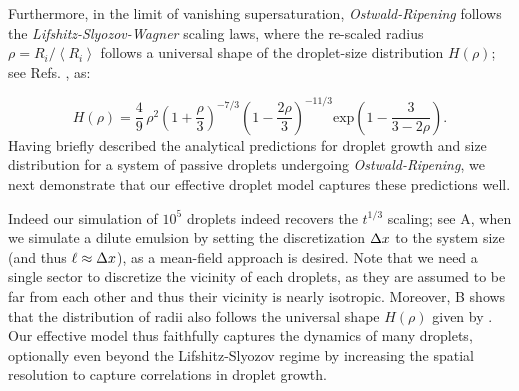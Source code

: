 Furthermore, in the limit of vanishing supersaturation, \textit{Ostwald-Ripening} follows the \textit{Lifshitz-Slyozov-Wagner} scaling laws, where the re-scaled radius $\rho = R_i/{\left \langle R_i \right \rangle}$ follows a universal shape of the droplet-size distribution $H(\rho)$; see Refs. \cite{Review2019,LSWanalytics}, as:

\begin{equation}
\label{eqn:LSW_histogram}
    H(\rho) = \frac{4}{9} \, \rho^2\left ( 1+ \frac{\rho}{3} \right ) ^ {-7/3} \left ( 1-\frac{2 \rho}{3} \right )^{-11/3} \mathrm{exp} \left ( 1 - \frac{3}{3 - 2\rho} \right ).
\end{equation}
Having briefly described the analytical predictions for droplet growth and size distribution for a system of passive droplets undergoing \textit{Ostwald-Ripening}, we next demonstrate that our effective droplet model captures these predictions well. 

Indeed our simulation of $10^5$ droplets indeed recovers the $t^{1/3}$ scaling; see A, when we simulate a dilute emulsion by setting the discretization $\Delta x$ to the system size (and thus $\ell \approx \Delta x$), as a mean-field approach is desired.
Note that we need a single sector to discretize the vicinity of each droplets, as they are assumed to be far from each other and thus their vicinity is nearly isotropic.
Moreover, B shows that the distribution of radii also follows the universal shape $H(\rho)$ given by .
Our effective model thus faithfully captures the dynamics of many droplets, optionally even beyond the Lifshitz-Slyozov regime by increasing the spatial resolution to capture correlations in droplet growth.


